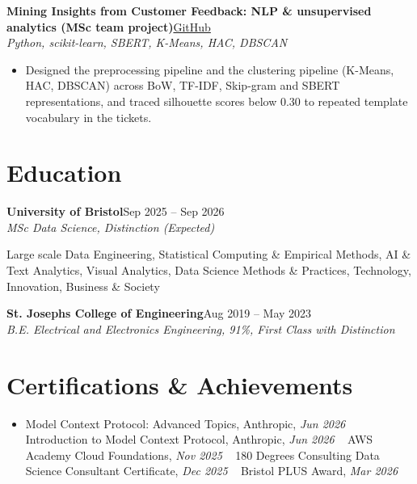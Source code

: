 \documentclass[a4paper,11pt]{article}
\newcommand{\roleNoLoc}[3]{%
  \textbf{#1}\hfill{\color{muted}#2}\\
  \textit{#3}\par}
\newcommand{\project}[3]{%
  \textbf{#1}\hfill#3\\
  {\color{muted}\small\textit{#2}}\par}
\newcommand{\gh}[1]{\href{#1}{\small GitHub}}
\newcommand{\gap}{\vspace{5pt}}
\begin{document}
\gap
{}
\project{Mining Insights from Customer Feedback: NLP \& unsupervised analytics (MSc team project)}{Python, scikit-learn, SBERT, K-Means, HAC, DBSCAN}{\gh{https://github.com/Thiruvel-AP/TextAnalytics}}
\begin{itemize}
  \item Designed the preprocessing pipeline and the clustering pipeline (K-Means, HAC, DBSCAN) across BoW, TF-IDF, Skip-gram and SBERT representations, and traced silhouette scores below 0.30 to repeated template vocabulary in the tickets.
\end{itemize}

\section{Education}
\roleNoLoc{University of Bristol}{Sep 2025 – Sep 2026}{MSc Data Science, Distinction \textit{(Expected)}}
{\color{muted}\small Large scale Data Engineering, Statistical Computing \& Empirical Methods, AI \& Text Analytics, Visual Analytics, Data Science Methods \& Practices, Technology, Innovation, Business \& Society}\par
\gap
{}
\roleNoLoc{St. Joseph\textquotesingle{}s College of Engineering}{Aug 2019 – May 2023}{B.E. Electrical and Electronics Engineering, 91\%, First Class with Distinction}

\section{Certifications \& Achievements}
\begin{itemize}
  \item Model Context Protocol: Advanced Topics, Anthropic, \textit{Jun 2026}\nobreak\ \,\textperiodcentered\, Introduction to Model Context Protocol, Anthropic, \textit{Jun 2026}\nobreak\ \,\textperiodcentered\, AWS Academy Cloud Foundations, \textit{Nov 2025}\nobreak\ \,\textperiodcentered\, 180 Degrees Consulting Data Science Consultant Certificate, \textit{Dec 2025}\nobreak\ \,\textperiodcentered\, Bristol PLUS Award, \textit{Mar 2026}
\end{itemize}
\end{document}
